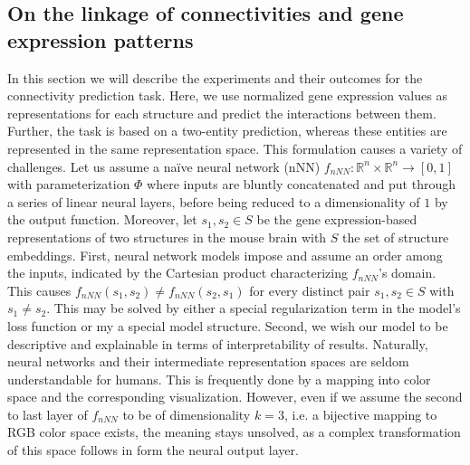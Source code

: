 \documentclass[]{article}
\begin{document}
\subsection{On the linkage of connectivities and gene expression patterns}
\label{sec:results_connpred}
In this section we will describe the experiments and their outcomes for the connectivity prediction task. Here, we use normalized gene expression values as representations for each structure and predict the interactions between them. Further, the task is based on a two-entity prediction, whereas these entities are represented in the same representation space. 
This formulation causes a variety of challenges. Let us assume a na\"ive neural network (nNN) $f_{nNN}:\mathbb{R}^n\times \mathbb{R}^n\rightarrow [0,1]$ with parameterization $\Phi$ where inputs are bluntly concatenated and put through a series of linear neural layers, before being reduced to a dimensionality of $1$ by the output function. Moreover, let $s_1, s_2\in S$ be the gene expression-based representations of two structures in the mouse brain with $S$ the set of structure embeddings.
First, neural network models impose and assume an order among the inputs, indicated by the Cartesian product characterizing $f_{nNN}$'s domain. This causes $f_{nNN}(s_1, s_2)\neq f_{nNN}(s_2, s_1)$ for every distinct pair $s_1,s_2\in S$ with $s_1\neq s_2$. This may be solved by either a special regularization term in the model's loss function or my a special model structure. 
Second, we wish our model to be descriptive and explainable in terms of interpretability of results. Naturally, neural networks and their intermediate representation spaces are seldom understandable for humans. This is frequently done by a mapping into color space and the corresponding visualization. However, even if we assume the second to last layer of $f_{nNN}$ to be of dimensionality $k=3$, i.e. a bijective mapping to RGB color space exists, the meaning stays unsolved, as a complex transformation of this space follows in form the neural output layer.\\
\end{document}
